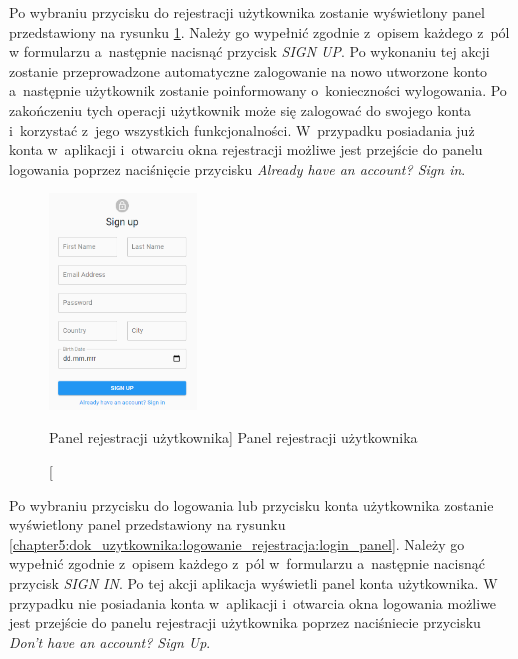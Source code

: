 \documentclass[../Kamil_Kowalewski_Main.tex]{subfiles}
\begin{document}
{{        Po wybraniu przycisku do rejestracji użytkownika zostanie wyświetlony panel
        przedstawiony na rysunku
        \ref{chapter5:dok_uzytkownika:logowanie_rejestracja:register_panel}.
        Należy go wypełnić zgodnie z~opisem każdego z~pól w formularzu a~następnie
        nacisnąć przycisk \textit{SIGN UP}. Po wykonaniu tej akcji zostanie
        przeprowadzone automatyczne zalogowanie na nowo utworzone konto
        a~następnie użytkownik zostanie poinformowany o~konieczności wylogowania. Po
        zakończeniu tych operacji użytkownik może się zalogować do swojego konta
        i~korzystać z~jego wszystkich funkcjonalności. W~przypadku posiadania już konta
        w~aplikacji i~otwarciu okna rejestracji możliwe jest przejście do panelu
        logowania poprzez naciśnięcie przycisku
        \textit{Already have an account? Sign in}.
        \begin{figure}[H]
            \centering
            \includegraphics[width=0.35\textwidth, keepaspectratio]
            {img/chapter5/loginregister/register_panel.png}
            \caption
            [Panel rejestracji użytkownika]
            {Panel rejestracji użytkownika}
            \label{chapter5:dok_uzytkownika:logowanie_rejestracja:register_panel}
        \end{figure}

        Po wybraniu przycisku do logowania lub przycisku konta użytkownika zostanie
        wyświetlony panel przedstawiony na rysunku
        \ref{chapter5:dok_uzytkownika:logowanie_rejestracja:login_panel}.
        Należy go wypełnić zgodnie z~opisem każdego z~pól w~formularzu a~następnie
        nacisnąć przycisk \textit{SIGN IN}. Po tej akcji aplikacja wyświetli panel
        konta użytkownika. W przypadku nie posiadania konta w~aplikacji i~otwarcia okna
        logowania możliwe jest przejście do panelu rejestracji użytkownika poprzez
        naciśniecie przycisku \textit{Don't have an account? Sign Up}.

}}
\end{document}
